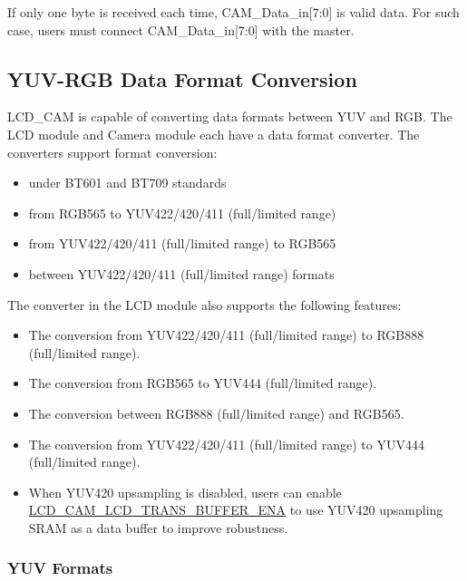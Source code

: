 \documentclass[main\_\_EN.tex]{subfiles}
\begin{document}
\begin{tiplisting}
If only one byte is received each time, CAM\_Data\_in[7:0] is valid data. For such case, users must connect CAM\_Data\_in[7:0] with the master.
\end{tiplisting}

\subsection{YUV-RGB Data Format Conversion}\label{sec:yuvrgb_config}

LCD\_CAM is capable of converting data formats between YUV and RGB. The LCD module and Camera module each have a data format converter. The converters support format conversion:
\begin{itemize}
    \item under BT601 and BT709 standards    
    \item from RGB565 to YUV422/420/411 (full/limited range)    
    \item from YUV422/420/411 (full/limited range) to RGB565
    \item between YUV422/420/411 (full/limited range) formats
\end{itemize}    

The converter in the LCD module also supports the following features:
        \begin{itemize}
        \item The conversion from YUV422/420/411 (full/limited range) to RGB888 (full/limited range).
        \item The conversion from RGB565  to YUV444 (full/limited range).
        \item The conversion between RGB888 (full/limited range) and RGB565.
        \item The conversion from YUV422/420/411 (full/limited range) to YUV444 (full/limited range).
        \item When YUV420 upsampling is disabled, users can enable \hyperref[fielddesc:LCDCAMLCDTRANSBUFFERENA]{LCD\_CAM\_LCD\_TRANS\_BUFFER\_ENA} to use YUV420 upsampling SRAM as a data buffer to improve robustness.
        \end{itemize}

\subsubsection{YUV Formats}
\end{document}
